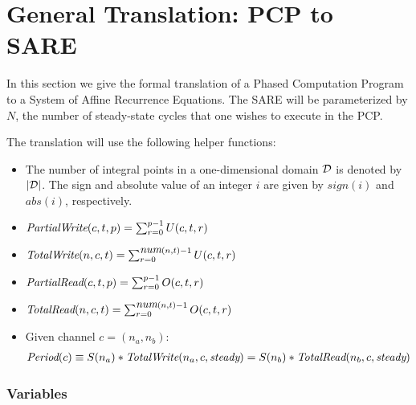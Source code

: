 \section{General Translation: PCP to SARE}
\label{sec:translate}

In this section we give the formal translation of a Phased Computation
Program to a System of Affine Recurrence Equations.  The SARE will be
parameterized by $N$, the number of steady-state cycles that one
wishes to execute in the PCP.

The translation will use the following helper functions:
\begin{itemize}

\item The number of integral points in a one-dimensional domain ${\cal
D}$ is denoted by $|{\cal D}|$.  The sign and absolute value of an
integer $i$ are given by $sign(i)$ and $abs(i)$, respectively.

\item $\mbox{\it PartialWrite}(c,t,p) = \sum_{r=0}^{p-1} U(c, t, r)$

\item $\mbox{\it TotalWrite}(n,c,t) = \sum_{r=0}^{\mbox{\it num}(n, t)-1} U(c, t, r)$

\item $\mbox{\it PartialRead}(c,t,p) = \sum_{r=0}^{p-1} O(c, t, r)$

\item $\mbox{\it TotalRead}(n,c,t) =  \sum_{r=0}^{\mbox{\it num}(n, t)-1} O(c, t, r)$

\item Given channel $c = (n_a, n_b)$:
\begin{align*}
\mbox{\it Period}(c) \equiv S(n_a) * \mbox{\it TotalWrite}(n_a, c, \mbox{\it steady}) = 
S(n_b) * \mbox{\it TotalRead}(n_b, c, \mbox{\it steady})
\end{align*}

\end{itemize}

\subsubsection{Variables}

